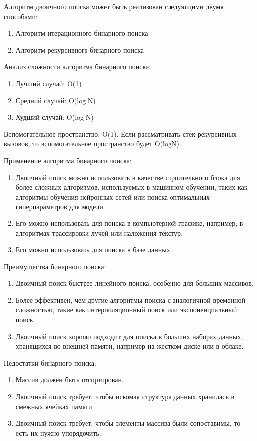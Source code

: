 Алгоритм двоичного поиска может быть реализован следующими двумя способами:
\begin{enumerate}
\item Алгоритм итерационного бинарного поиска
\item Алгоритм рекурсивного бинарного поиска
\end{enumerate}

Анализ сложности алгоритма бинарного поиска:
\begin{enumerate}
\item Лучший случай: O(1)
\item Средний случай: O(log N)
\item Худший случай: O(log N)
\end{enumerate}

Вспомогательное пространство: O(1). Если рассматривать стек рекурсивных вызовов, то вспомогательное пространство будет O(logN).

Применение алгоритма бинарного поиска:
\begin{enumerate}
\item Двоичный поиск можно использовать в качестве строительного блока для более сложных алгоритмов, используемых в машинном обучении, таких как алгоритмы обучения нейронных сетей или поиска оптимальных гиперпараметров для модели.
\item Его можно использовать для поиска в компьютерной графике, например, в алгоритмах трассировки лучей или наложения текстур.
\item Его можно использовать для поиска в базе данных.
\end{enumerate}

Преимущества бинарного поиска:
\begin{enumerate}
\item Двоичный поиск быстрее линейного поиска, особенно для больших массивов.
\item Более эффективен, чем другие алгоритмы поиска с аналогичной временной сложностью, такие как интерполяционный поиск или экспоненциальный поиск.
\item Двоичный поиск хорошо подходит для поиска в больших наборах данных, хранящихся во внешней памяти, например на жестком диске или в облаке.
\end{enumerate}

Недостатки бинарного поиска:
\begin{enumerate}
\item Массив должен быть отсортирован.
\item Двоичный поиск требует, чтобы искомая структура данных хранилась в смежных ячейках памяти.
\item Двоичный поиск требует, чтобы элементы массива были сопоставимы, то есть их нужно упорядочить.
\end{enumerate}

